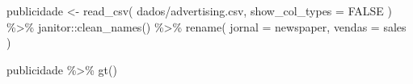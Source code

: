 \documentclass[
  letterpaper,
  DIV=11,
  numbers=noendperiod]{scrreprt}
\newenvironment{Shaded}{\begin{snugshade}}{\end{snugshade}}
\newcommand{\AttributeTok}[1]{\textcolor[rgb]{0.40,0.45,0.13}{#1}}
\newcommand{\ConstantTok}[1]{\textcolor[rgb]{0.56,0.35,0.01}{#1}}
\newcommand{\FunctionTok}[1]{\textcolor[rgb]{0.28,0.35,0.67}{#1}}
\newcommand{\NormalTok}[1]{\textcolor[rgb]{0.00,0.23,0.31}{#1}}
\newcommand{\OtherTok}[1]{\textcolor[rgb]{0.00,0.23,0.31}{#1}}
\newcommand{\SpecialCharTok}[1]{\textcolor[rgb]{0.37,0.37,0.37}{#1}}
\newcommand{\StringTok}[1]{\textcolor[rgb]{0.13,0.47,0.30}{#1}}
\begin{document}
\begin{Shaded}
\begin{Highlighting}[]
\NormalTok{publicidade }\OtherTok{\textless{}{-}} \FunctionTok{read\_csv}\NormalTok{(}
  \StringTok{\textquotesingle{}dados/advertising.csv\textquotesingle{}}\NormalTok{,}
  \AttributeTok{show\_col\_types =} \ConstantTok{FALSE}
\NormalTok{) }\SpecialCharTok{\%\textgreater{}\%} 
\NormalTok{  janitor}\SpecialCharTok{::}\FunctionTok{clean\_names}\NormalTok{() }\SpecialCharTok{\%\textgreater{}\%} 
  \FunctionTok{rename}\NormalTok{(}
    \AttributeTok{jornal =}\NormalTok{ newspaper,}
    \AttributeTok{vendas =}\NormalTok{ sales}
\NormalTok{  )}

\NormalTok{publicidade }\SpecialCharTok{\%\textgreater{}\%} \FunctionTok{gt}\NormalTok{()}
\end{Highlighting}
\end{Shaded}
\end{document}
